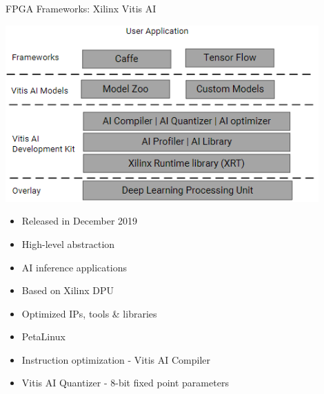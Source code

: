 \begin{frame}{FPGA Frameworks: Xilinx Vitis AI}
	\begin{minipage}{0.6\textwidth}
		\centering
		\includegraphics[width=0.9\textwidth]{../Images/Hardware/vitis-ai-stack.png}\\
	\end{minipage}%
	\begin{minipage}{0.4\textwidth}
		\begin{itemize}
			\item Released in December 2019
			\item High-level abstraction
			\item AI inference applications
			\item Based on Xilinx DPU
			\item Optimized IPs, tools \& libraries
			\item PetaLinux
			\item Instruction optimization - Vitis AI Compiler
			\item Vitis AI Quantizer - 8-bit fixed point parameters
		\end{itemize}
	\end{minipage}
\end{frame}

